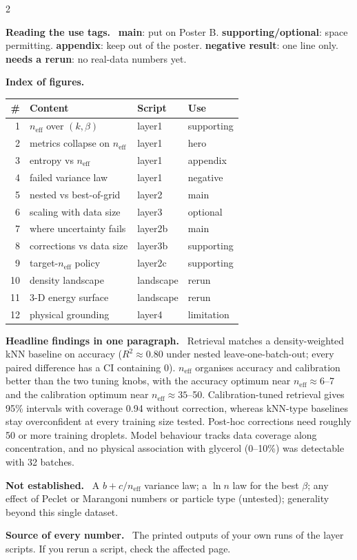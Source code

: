 \documentclass[10pt,a4paper]{article}
\newcommand{\neff}{n_{\mathrm{eff}}}
\newcommand{\sect}[1]{\par\smallskip\noindent\textbf{\color{black!85}#1}\ }
\begin{document}
\begin{multicols}{2}
\sect{Reading the use tags.} \textbf{\color{gmain}main}: put on Poster B. \textbf{\color{gsup}supporting/optional}: space permitting. \textbf{\color{gapp}appendix}: keep out of the poster. \textbf{\color{gneg}negative result}: one line only. \textbf{\color{gfix}needs a rerun}: no real-data numbers yet.
\columnbreak
\sect{Index of figures.}\par\smallskip
{\footnotesize\renewcommand{\arraystretch}{1.25}
\begin{tabular}{@{}rp{29mm}p{24mm}l@{}}\hline
\# & Content & Script & Use\\\hline
1 & $\neff$ over $(k,\beta)$ & layer1 & {\color{gsup}supporting}\\
2 & metrics collapse on $\neff$ & layer1 & {\color{gmain}hero}\\
3 & entropy vs $\neff$ & layer1 & {\color{gapp}appendix}\\
4 & failed variance law & layer1 & {\color{gneg}negative}\\
5 & nested vs best-of-grid & layer2 & {\color{gmain}main}\\
6 & scaling with data size & layer3 & {\color{gsup}optional}\\
7 & where uncertainty fails & layer2b & {\color{gmain}main}\\
8 & corrections vs data size & layer3b & {\color{gsup}supporting}\\
9 & target-$\neff$ policy & layer2c & {\color{gsup}supporting}\\
10 & density landscape & landscape & {\color{gfix}rerun}\\
11 & 3-D energy surface & landscape & {\color{gfix}rerun}\\
12 & physical grounding & layer4 & {\color{gsup}limitation}\\\hline\end{tabular}}
\sect{Headline findings in one paragraph.} Retrieval matches a density-weighted kNN baseline on accuracy ($R^2\approx0.80$ under nested leave-one-batch-out; every paired difference has a CI containing 0). $\neff$ organises accuracy and calibration better than the two tuning knobs, with the accuracy optimum near $\neff\approx6$--7 and the calibration optimum near $\neff\approx35$--50. Calibration-tuned retrieval gives 95\% intervals with coverage 0.94 without correction, whereas kNN-type baselines stay overconfident at every training size tested. Post-hoc corrections need roughly 50 or more training droplets. Model behaviour tracks data coverage along concentration, and no physical association with glycerol (0--10\%) was detectable with 32 batches.
\sect{Not established.} A $b+c/\neff$ variance law; a $\ln n$ law for the best $\beta$; any effect of Peclet or Marangoni numbers or particle type (untested); generality beyond this single dataset.
\sect{Source of every number.} The printed outputs of your own runs of the layer scripts. If you rerun a script, check the affected page.
\end{multicols}
\clearpage
\end{document}
